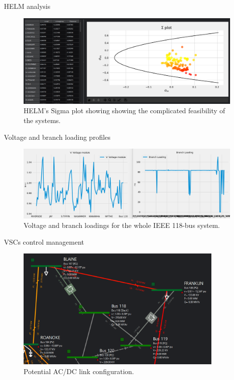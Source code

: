 \begin{frame}{HELM analysis}
    \begin{figure}[H]
        \centering
    \includegraphics[width=0.99\textwidth]{Images/sigma_ie1182.png}
    \caption{HELM's Sigma plot showing showing the complicated feasibility of the systems.}
    \label{fig:118helm}
    \end{figure}
\end{frame}

\begin{frame}{Voltage and branch loading profiles}
    \begin{figure}[H]
        \centering
    \includegraphics[width=0.99\textwidth]{Images/vl_ie18_v3.png}
    \caption{Voltage and branch loadings for the whole IEEE 118-bus system.}
    \label{fig:118vl}
    \end{figure}
\end{frame}

\begin{frame}{VSCs control management}
    \begin{figure}[H]
        \centering
    \includegraphics[width=0.90\textwidth]{Images/ie18_v3_fixed.png}
    \caption{Potential AC/DC link configuration.}
    \label{fig:118acdc}
    \end{figure}
\end{frame}







